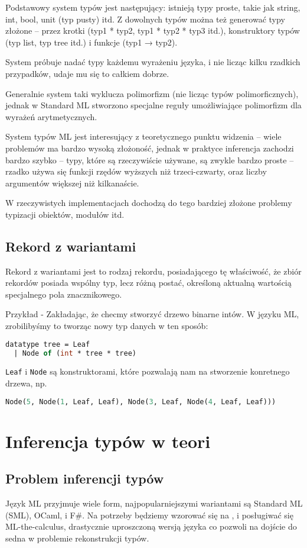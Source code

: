 \documentclass{article}
\begin{document}
Podstawowy system typów jest następujący: istnieją typy proste, takie jak string, int, bool, unit (typ pusty) itd. Z dowolnych typów można też generować typy złożone – przez krotki (typ1 * typ2, typ1 * typ2 * typ3 itd.), konstruktory typów (typ list, typ tree itd.) i funkcje (typ1 → typ2).

System próbuje nadać typy każdemu wyrażeniu języka, i nie licząc kilku rzadkich przypadków, udaje mu się to całkiem dobrze.

Generalnie system taki wyklucza polimorfizm (nie licząc typów polimorficznych), jednak w Standard ML stworzono specjalne reguły umożliwiające polimorfizm dla wyrażeń arytmetycznych.

System typów ML jest interesujący z teoretycznego punktu widzenia – wiele problemów ma bardzo wysoką złożoność, jednak w praktyce inferencja zachodzi bardzo szybko – typy, które są rzeczywiście używane, są zwykle bardzo proste – rzadko używa się funkcji rzędów wyższych niż trzeci-czwarty, oraz liczby argumentów większej niż kilkanaście.

W rzeczywistych implementacjach dochodzą do tego bardziej złożone problemy typizacji obiektów, modułów itd.

\subsection{Rekord z wariantami} Rekord z wariantami jest to rodzaj rekordu, posiadającego tę właściwość, że zbiór rekordów posiada wspólny typ, lecz różną postać, określoną aktualną wartością specjalnego pola znacznikowego.

Przykład - Zakładając, że checmy stworzyć drzewo binarne intów. W języku ML, zrobilibyśmy to tworząc nowy typ danych w ten sposób:
\begin{lstlisting}[language=ML]
datatype tree = Leaf
  | Node of (int * tree * tree)
\end{lstlisting}
\lstinline{Leaf} i \lstinline{Node} są konstruktorami, które pozwalają nam na stworzenie konretnego drzewa, np.
\begin{lstlisting}[language=ML]
  Node(5, Node(1, Leaf, Leaf), Node(3, Leaf, Node(4, Leaf, Leaf)))
\end{lstlisting}
\section{Inferencja typów w teori}
\subsection{Problem inferencji typów}
Język ML przyjmuje wiele form, najpopularniejszymi wariantami są Standard ML (SML), OCaml,
i F\#. Na potrzeby będziemy wzorować się na \cite{Damas__Milner__1982}, i posługiwać się ML-the-calculus, drastycznie uproszczoną wersją języka co pozwoli na dojście do sedna w problemie rekonstrukcji typów.
\end{document}
